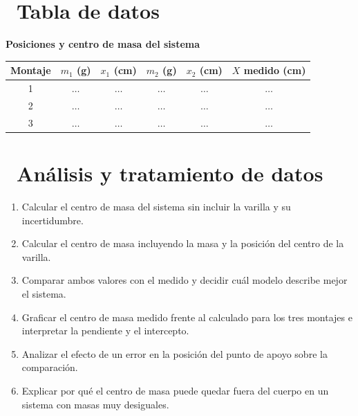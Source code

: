 \documentclass[11pt,a4paper]{article}
\newcommand{\iconotexto}[2]{\textcolor{cyanNeon}{\faIcon{#1}}~#2}
\begin{document}
\section{\iconotexto{table}{Tabla de datos}}

\begin{center}
\begin{minipage}{\linewidth}
\centering
{\small
\textbf{Posiciones y centro de masa del sistema}\par\smallskip
\begin{tabular}{@{}cccccc@{}}
\toprule
Montaje & $m_1$ (g) & $x_1$ (cm) & $m_2$ (g) & $x_2$ (cm) & $X$ medido (cm) \\
\midrule
1 & $\ldots$ & $\ldots$ & $\ldots$ & $\ldots$ & $\ldots$ \\
2 & $\ldots$ & $\ldots$ & $\ldots$ & $\ldots$ & $\ldots$ \\
3 & $\ldots$ & $\ldots$ & $\ldots$ & $\ldots$ & $\ldots$ \\
\bottomrule
\end{tabular}
}\par{}
\end{minipage}
\end{center}

\section{\iconotexto{calculator}{Análisis y tratamiento de datos}}

\begin{enumerate}[leftmargin=1.4em,itemsep=2pt,topsep=3pt]
  \item Calcular el centro de masa del sistema sin incluir la varilla y su incertidumbre.
  \item Calcular el centro de masa incluyendo la masa y la posición del centro de la varilla.
  \item Comparar ambos valores con el medido y decidir cuál modelo describe mejor el sistema.
  \item Graficar el centro de masa medido frente al calculado para los tres montajes e interpretar la pendiente y el intercepto.
  \item Analizar el efecto de un error en la posición del punto de apoyo sobre la comparación.
  \item Explicar por qué el centro de masa puede quedar fuera del cuerpo en un sistema con masas muy desiguales.
\end{enumerate}
\end{document}
